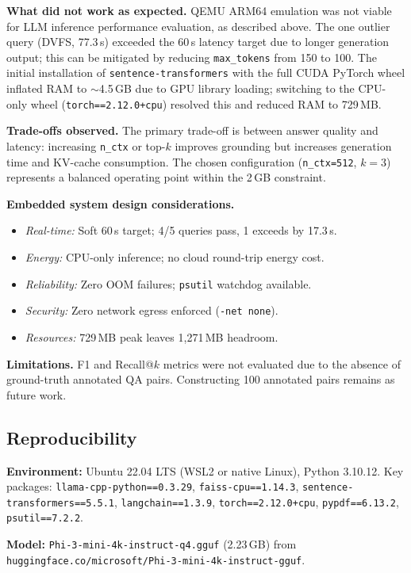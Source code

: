 \documentclass[10pt,twocolumn]{article}
\begin{document}
\textbf{What did not work as expected.} QEMU ARM64 emulation was not viable
for LLM inference performance evaluation, as described above. The one outlier
query (DVFS, 77.3\,s) exceeded the 60\,s latency target due to longer
generation output; this can be mitigated by reducing \texttt{max\_tokens}
from 150 to 100. The initial installation of \texttt{sentence-transformers}
with the full CUDA PyTorch wheel inflated RAM to $\sim$4.5\,GB due to GPU
library loading; switching to the CPU-only wheel (\texttt{torch==2.12.0+cpu})
resolved this and reduced RAM to 729\,MB.

\textbf{Trade-offs observed.} The primary trade-off is between answer quality
and latency: increasing \texttt{n\_ctx} or top-$k$ improves grounding but
increases generation time and KV-cache consumption. The chosen configuration
(\texttt{n\_ctx=512}, $k=3$) represents a balanced operating point within
the 2\,GB constraint.

\textbf{Embedded system design considerations.}
\begin{itemize}
    \item \textit{Real-time:} Soft 60\,s target; 4/5 queries pass, 1 exceeds by 17.3\,s.
    \item \textit{Energy:} CPU-only inference; no cloud round-trip energy cost.
    \item \textit{Reliability:} Zero OOM failures; \texttt{psutil} watchdog available.
    \item \textit{Security:} Zero network egress enforced (\texttt{-net none}).
    \item \textit{Resources:} 729\,MB peak leaves 1{,}271\,MB headroom.
\end{itemize}

\textbf{Limitations.} F1 and Recall@$k$ metrics were not evaluated due to
the absence of ground-truth annotated QA pairs. Constructing 100 annotated
pairs remains as future work.

\subsection{Reproducibility}

\textbf{Environment:} Ubuntu 22.04 LTS (WSL2 or native Linux), Python 3.10.12.
Key packages: \texttt{llama-cpp-python==0.3.29}, \texttt{faiss-cpu==1.14.3},
\texttt{sentence-transformers==5.5.1}, \texttt{langchain==1.3.9},
\texttt{torch==2.12.0+cpu}, \texttt{pypdf==6.13.2}, \texttt{psutil==7.2.2}.

\textbf{Model:} \texttt{Phi-3-mini-4k-instruct-q4.gguf} (2.23\,GB) from
\texttt{huggingface.co/microsoft/Phi-3-mini-4k-instruct-gguf}.
\end{document}
